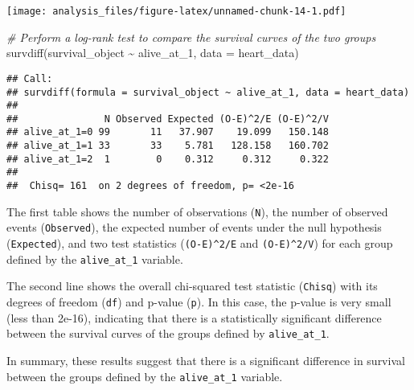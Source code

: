 \documentclass[
]{article}
\newenvironment{Shaded}{\begin{snugshade}}{\end{snugshade}}
\newcommand{\AttributeTok}[1]{\textcolor[rgb]{0.77,0.63,0.00}{#1}}
\newcommand{\CommentTok}[1]{\textcolor[rgb]{0.56,0.35,0.01}{\textit{#1}}}
\newcommand{\FunctionTok}[1]{\textcolor[rgb]{0.00,0.00,0.00}{#1}}
\newcommand{\NormalTok}[1]{#1}
\newcommand{\SpecialCharTok}[1]{\textcolor[rgb]{0.00,0.00,0.00}{#1}}
\begin{document}
\texttt{[image: analysis\_files/figure-latex/unnamed-chunk-14-1.pdf]}

\begin{Shaded}
\begin{Highlighting}[]
\CommentTok{\# Perform a log{-}rank test to compare the survival curves of the two groups}
\FunctionTok{survdiff}\NormalTok{(survival\_object }\SpecialCharTok{\textasciitilde{}}\NormalTok{ alive\_at\_1, }\AttributeTok{data =}\NormalTok{ heart\_data)}
\end{Highlighting}
\end{Shaded}

\begin{verbatim}
## Call:
## survdiff(formula = survival_object ~ alive_at_1, data = heart_data)
## 
##               N Observed Expected (O-E)^2/E (O-E)^2/V
## alive_at_1=0 99       11   37.907    19.099   150.148
## alive_at_1=1 33       33    5.781   128.158   160.702
## alive_at_1=2  1        0    0.312     0.312     0.322
## 
##  Chisq= 161  on 2 degrees of freedom, p= <2e-16
\end{verbatim}

The first table shows the number of observations (\texttt{N}), the
number of observed events (\texttt{Observed}), the expected number of
events under the null hypothesis (\texttt{Expected}), and two test
statistics (\texttt{(O-E)\^{}2/E} and \texttt{(O-E)\^{}2/V}) for each
group defined by the \texttt{alive\_at\_1} variable.

The second line shows the overall chi-squared test statistic
(\texttt{Chisq}) with its degrees of freedom (\texttt{df}) and p-value
(\texttt{p}). In this case, the p-value is very small (less than 2e-16),
indicating that there is a statistically significant difference between
the survival curves of the groups defined by \texttt{alive\_at\_1}.

In summary, these results suggest that there is a significant difference
in survival between the groups defined by the \texttt{alive\_at\_1}
variable.
\end{document}
